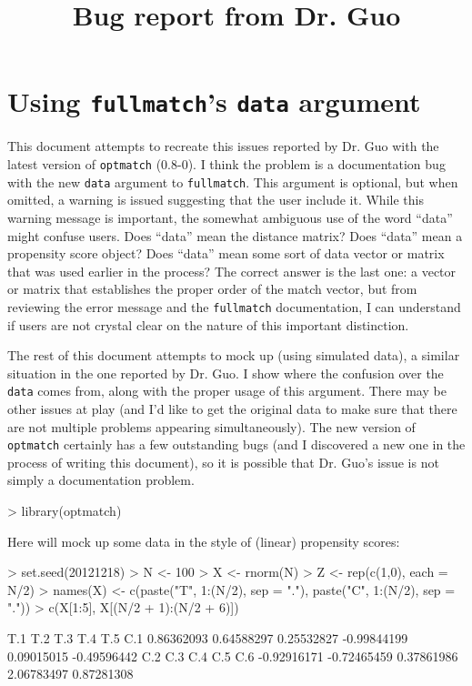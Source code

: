 \documentclass{article}
\title{Bug report from Dr. Guo}
\begin{document}
\maketitle

\section{Using \texttt{fullmatch}'s \texttt{data} argument}

This document attempts to recreate this issues reported by Dr. Guo with the
latest version of \texttt{optmatch} (0.8-0). I think the problem is a
documentation bug with the new \texttt{data} argument to \texttt{fullmatch}.
This argument is optional, but when omitted, a warning is issued suggesting
that the user include it. While this warning message is important, the
somewhat ambiguous use of the word ``data'' might confuse users. Does ``data''
mean the distance matrix? Does ``data'' mean a propensity score object? Does
``data'' mean some sort of data vector or matrix that was used earlier in the
process? The correct answer is the last one: a vector or matrix that
establishes the proper order of the match vector, but from reviewing the error
message and the \texttt{fullmatch} documentation, I can understand if users
are not crystal clear on the nature of this important distinction.

The rest of this document attempts to mock up (using simulated data), a
similar situation in the one reported by Dr. Guo. I show where the confusion
over the \texttt{data} comes from, along with the proper usage of this
argument. There may be other issues at play (and I'd like to get the original
data to make sure that there are not multiple problems appearing
simultaneously). The new version of \texttt{optmatch} certainly has a few
outstanding bugs (and I discovered a new one in the process of writing this
document), so it is possible that Dr. Guo's issue is not simply a
documentation problem.

\begin{Schunk}
\begin{Sinput}
> library(optmatch)
\end{Sinput}
\end{Schunk}

Here will mock up some data in the style of (linear) propensity scores:
\begin{Schunk}
\begin{Sinput}
> set.seed(20121218)
> N <- 100
> X <- rnorm(N)
> Z <- rep(c(1,0), each = N/2)
> names(X) <- c(paste("T", 1:(N/2), sep = "."), paste("C", 1:(N/2), sep = "."))
> c(X[1:5], X[(N/2 + 1):(N/2 + 6)])
\end{Sinput}
\begin{Soutput}
        T.1         T.2         T.3         T.4         T.5         C.1 
 0.86362093  0.64588297  0.25532827 -0.99844199  0.09015015 -0.49596442 
        C.2         C.3         C.4         C.5         C.6 
-0.92916171 -0.72465459  0.37861986  2.06783497  0.87281308 
\end{Soutput}
\end{Schunk}
\end{document}
